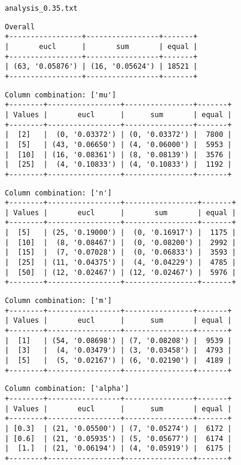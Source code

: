 \documentclass{article}
\begin{document}
\begin{verbatim}

\end{verbatim}

\newpage
\verb|analysis_0.35.txt|
\begin{verbatim}
Overall
+-----------------+-----------------+-------+
|       eucl      |       sum       | equal |
+-----------------+-----------------+-------+
| (63, '0.05876') | (16, '0.05624') | 18521 |
+-----------------+-----------------+-------+
\end{verbatim}

\begin{verbatim}
Column combination: ['mu']
+--------+-----------------+----------------+-------+
| Values |       eucl      |      sum       | equal |
+--------+-----------------+----------------+-------+
|  [2]   |  (0, '0.03372') | (0, '0.03372') |  7800 |
|  [5]   | (43, '0.06650') | (4, '0.06000') |  5953 |
|  [10]  | (16, '0.08361') | (8, '0.08139') |  3576 |
|  [25]  |  (4, '0.10833') | (4, '0.10833') |  1192 |
+--------+-----------------+----------------+-------+
\end{verbatim}

\begin{verbatim}
Column combination: ['n']
+--------+-----------------+-----------------+-------+
| Values |       eucl      |       sum       | equal |
+--------+-----------------+-----------------+-------+
|  [5]   | (25, '0.19000') |  (0, '0.16917') |  1175 |
|  [10]  |  (8, '0.08467') |  (0, '0.08200') |  2992 |
|  [15]  |  (7, '0.07028') |  (0, '0.06833') |  3593 |
|  [25]  | (11, '0.04375') |  (4, '0.04229') |  4785 |
|  [50]  | (12, '0.02467') | (12, '0.02467') |  5976 |
+--------+-----------------+-----------------+-------+
\end{verbatim}

\begin{verbatim}
Column combination: ['m']
+--------+-----------------+----------------+-------+
| Values |       eucl      |      sum       | equal |
+--------+-----------------+----------------+-------+
|  [1]   | (54, '0.08698') | (7, '0.08208') |  9539 |
|  [3]   |  (4, '0.03479') | (3, '0.03458') |  4793 |
|  [5]   |  (5, '0.02167') | (6, '0.02190') |  4189 |
+--------+-----------------+----------------+-------+
\end{verbatim}

\begin{verbatim}
Column combination: ['alpha']
+--------+-----------------+----------------+-------+
| Values |       eucl      |      sum       | equal |
+--------+-----------------+----------------+-------+
| [0.3]  | (21, '0.05500') | (7, '0.05274') |  6172 |
| [0.6]  | (21, '0.05935') | (5, '0.05677') |  6174 |
|  [1.]  | (21, '0.06194') | (4, '0.05919') |  6175 |
+--------+-----------------+----------------+-------+
\end{verbatim}
\end{document}
